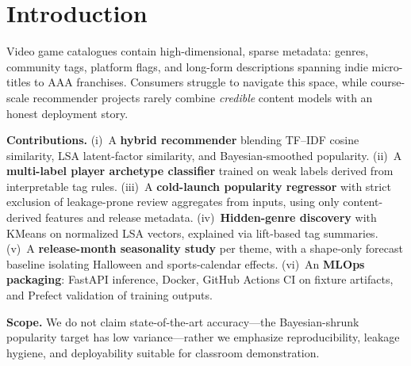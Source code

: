 \section{Introduction}
Video game catalogues contain high-dimensional, sparse metadata: genres, community tags, platform flags, and long-form descriptions spanning indie micro-titles to AAA franchises. Consumers struggle to navigate this space, while course-scale recommender projects rarely combine \emph{credible} content models with an honest deployment story.

\textbf{Contributions.} (i)~A \textbf{hybrid recommender} blending TF--IDF cosine similarity, LSA latent-factor similarity, and Bayesian-smoothed popularity. (ii)~A \textbf{multi-label player archetype classifier} trained on weak labels derived from interpretable tag rules. (iii)~A \textbf{cold-launch popularity regressor} with strict exclusion of leakage-prone review aggregates from inputs, using only content-derived features and release metadata. (iv)~\textbf{Hidden-genre discovery} with KMeans on normalized LSA vectors, explained via lift-based tag summaries. (v)~A \textbf{release-month seasonality study} per theme, with a shape-only forecast baseline isolating Halloween and sports-calendar effects. (vi)~An \textbf{MLOps packaging}: FastAPI inference, Docker, GitHub Actions CI on fixture artifacts, and Prefect validation of training outputs.

\textbf{Scope.} We do not claim state-of-the-art accuracy---the Bayesian-shrunk popularity target has low variance---rather we emphasize reproducibility, leakage hygiene, and deployability suitable for classroom demonstration.
